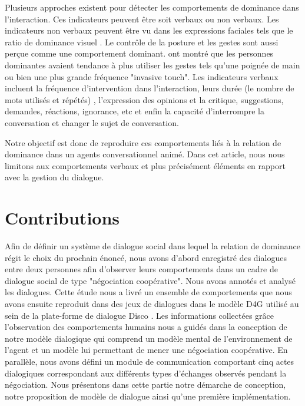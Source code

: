 \documentclass [french]{sig-alternate-05-2015}
\begin{document}
\par Plusieurs approches existent pour détecter les comportements de dominance dans l'interaction. Ces indicateurs peuvent être soit verbaux ou non verbaux. Les indicateurs non verbaux peuvent être vu dans les expressions faciales tels que le ratio de dominance visuel \cite{dunbar2005perceptions}. Le contrôle de la posture et les gestes sont aussi perçue comme une comportement dominant. \cite{carney-hall-lebeau-2005} ont montré que les personnes dominantes avaient tendance à plus utiliser les gestes tels qu'une poignée de main ou bien une plus grande fréquence "invasive touch". Les indicateurs verbaux incluent la fréquence d'intervention dans l'interaction, leurs durée (le nombre de mots utilisés et répétés) \cite{dunbar2005perceptions}, l'expression des opinions et la critique, suggestions, demandes, réactions, ignorance, etc \cite{zablotskaya2012relating} et enfin la capacité d'interrompre la conversation et changer le sujet de conversation.

Notre objectif est donc de reproduire ces comportements liés à la relation de dominance dans un agents conversationnel animé. Dans cet article, nous nous limitons aux comportements verbaux et plus précisément éléments en rapport avec la gestion du dialogue.

\section{Contributions}
\label{contribution}

\par Afin de définir un système de dialogue social dans lequel la relation de dominance régit le choix du prochain énoncé, nous avons d'abord enregistré des dialogues entre deux personnes afin d'observer leurs comportements dans un cadre de dialogue social de type "négociation coopérative". Nous avons annotés et analysé les dialogues. Cette étude nous a livré un ensemble de comportements  que nous avons ensuite reproduit dans des jeux de dialogues dans le modèle D4G utilisé au sein de la plate-forme de dialogue Disco \cite{rich2009building}. 
 Les informations collectées grâce l'observation des comportements humains nous a guidés dans la conception de notre modèle dialogique qui comprend un modèle mental de l'environnement de l'agent et un modèle lui permettant de mener une négociation coopérative. 
En parallèle, nous avons défini un module de communication comportant cinq actes dialogiques correspondant aux différents types d'échanges observés pendant la négociation. Nous présentons dans cette partie notre démarche de conception, notre proposition de modèle de dialogue ainsi qu'une première implémentation.
\end{document}
